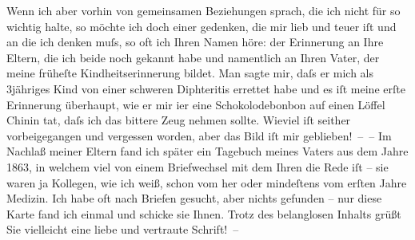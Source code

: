 \pstart
           Wenn ich aber vorhin von gemeinsamen Beziehungen sprach, die ich nicht für so wichtig
               halte, so möchte ich doch einer gedenken, die mir lieb und teuer iſt und an die ich
               denken muſs, so oft ich Ihren Namen höre: der Erinnerung an Ihre Eltern, die ich beide noch
               gekannt habe und namentlich an Ihren Vater, der meine früheſte Kindheitserinnerung bildet. Man
               sagte mir, daſs er mich als 3jähriges Kind von einer schweren Diphteritis errettet
               habe und es iſt meine erſte Erinnerung überhaupt, wie er mir i{\geminationm}er eine Schokolodebonbon auf einen Löffel Chinin tat,
               daſs ich das bittere Zeug nehmen sollte. Wieviel iſt seither vorbeigegangen und
               vergessen worden, aber das Bild iſt mir geblieben! – – Im Nachlaß meiner Eltern fand ich
               später ein Tagebuch meines Vaters aus dem Jahre 1863, in welchem viel von \introOben{}einem
                  Briefwechsel mit\introOben{} dem Ihren die Rede iſt – sie waren ja Kollegen, wie ich
               weiß, schon vom \label{K_L02572-3v}\label{K_L02572-3} her oder mindeſtens vom erſten
               Jahre Medizin. Ich habe oft nach Briefen gesucht, aber nichts gefunden – nur diese
               Karte fand ich einmal und schicke sie Ihnen. Trotz {\pb}des
               belanglosen Inhalts grüßt Sie vielleicht eine liebe und vertraute Schrift! –\pend
           
